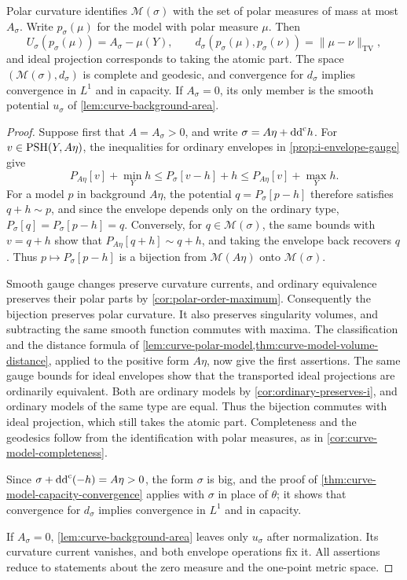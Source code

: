 \begin{proposition}\label{prop:curve-arbitrary-background-models}
Polar curvature identifies $\mathcal M(\sigma)$ with the set of polar measures of mass at most $A_\sigma$. Write $p_\sigma(\mu)$ for the model with polar measure $\mu$. Then
\[
 U_\sigma(p_\sigma(\mu))=A_\sigma-\mu(Y),\qquad
 d_\sigma(p_\sigma(\mu),p_\sigma(\nu))=\|\mu-\nu\|_{\mathrm{TV}},
\]
and ideal projection corresponds to taking the atomic part. The space $(\mathcal M(\sigma),d_\sigma)$ is complete and geodesic, and convergence for $d_\sigma$ implies convergence in $L^1$ and in capacity. If $A_\sigma=0$, its only member is the smooth potential $u_\sigma$ of \cref{lem:curve-background-area}.
\end{proposition}
\begin{proof}
Suppose first that $A=A_\sigma>0$, and write $\sigma=A\eta+\mathrm{dd}^{\mathrm{c}} h$. For $v\in\mathrm{PSH}(Y,A\eta)$, the inequalities for ordinary envelopes in \cref{prop:i-envelope-gauge} give
\[
 P_{A\eta}[v]+\min_Yh
 \leq P_\sigma[v-h]+h
 \leq P_{A\eta}[v]+\max_Yh.
\]
For a model $p$ in background $A\eta$, the potential $q=P_\sigma[p-h]$ therefore satisfies $q+h\sim p$, and since the envelope depends only on the ordinary type, $P_\sigma[q]=P_\sigma[p-h]=q$. Conversely, for $q\in\mathcal M(\sigma)$, the same bounds with $v=q+h$ show that $P_{A\eta}[q+h]\sim q+h$, and taking the envelope back recovers $q$. Thus $p\mapsto P_\sigma[p-h]$ is a bijection from $\mathcal M(A\eta)$ onto $\mathcal M(\sigma)$.

Smooth gauge changes preserve curvature currents, and ordinary equivalence preserves their polar parts by \cref{cor:polar-order-maximum}. Consequently the bijection preserves polar curvature. It also preserves singularity volumes, and subtracting the same smooth function commutes with maxima. The classification and the distance formula of \cref{lem:curve-polar-model,thm:curve-model-volume-distance}, applied to the positive form $A\eta$, now give the first assertions. The same gauge bounds for ideal envelopes show that the transported ideal projections are ordinarily equivalent. Both are ordinary models by \cref{cor:ordinary-preserves-i}, and ordinary models of the same type are equal. Thus the bijection commutes with ideal projection, which still takes the atomic part. Completeness and the geodesics follow from the identification with polar measures, as in \cref{cor:curve-model-completeness}.

Since $\sigma+\mathrm{dd}^{\mathrm{c}}(-h)=A\eta>0$, the form $\sigma$ is big, and the proof of \cref{thm:curve-model-capacity-convergence} applies with $\sigma$ in place of $\theta$; it shows that convergence for $d_\sigma$ implies convergence in $L^1$ and in capacity.

If $A_\sigma=0$, \cref{lem:curve-background-area} leaves only $u_\sigma$ after normalization. Its curvature current vanishes, and both envelope operations fix it. All assertions reduce to statements about the zero measure and the one-point metric space.
\end{proof}

